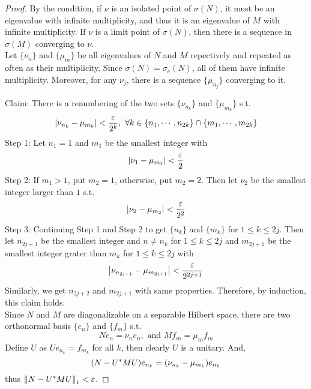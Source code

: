 \begin{proof}
	By the condition, if $\nu$ is an isolated point of $\sigma(N)$, it must be an eigenvalue with infinite multiplicity, and thus it is an eigenvalue of $M$ with infinite multiplicity. If $\nu$ is a limit point of $\sigma(N)$, then there is a sequence in $\sigma(M)$ converging to $\nu$. \\
	Let $\{\nu_n\}$ and $\{\mu_m\}$ be all eigenvalues of $N$ and $M$ repectively and repeated as often as their multiplicity. Since $\sigma(N) = \sigma_e(N)$, all of them have infinite multiplicity. Moreover, for any $\nu_j$, there is a sequence $\{\mu_{n_j}\}$ converging to it.
	\item Claim: There is a renumbering of the two sets $\{\nu_{n_k}\}$ and $\{\mu_{m_k}\}$ s.t. 
	\begin{equation*}
		\left\lvert\nu_{n_k} - \mu_{m_k}\right\lvert < \frac{\varepsilon}{2^k},~ \forall k \in \{n_1, \cdots, n_{2k}\} \cap \{m_1, \cdots, m_{2k}\}
	\end{equation*}
	Step 1: Let $n_1 = 1$ and $m_1$ be the smallest integer with 
	\begin{equation*}
		\left\lvert\nu_1 - \mu_{m_1}\right\lvert < \frac{\varepsilon}{2}
	\end{equation*}
	Step 2: If $m_1 > 1$, put $m_2 = 1$, otherwise, put $m_2 =2$. Then let $\nu_2$ be the smallest integer larger than $1$ s.t.
	\begin{equation*}
		\left\lvert\nu_2 - \mu_{m_2}\right\lvert < \frac{\varepsilon}{2^2}
	\end{equation*}
	Step 3: Continuing Step 1 and Step 2 to get $\{n_k\}$ and $\{m_k\}$ for $1 \leqslant k \leqslant 2j$. Then let $n_{2j+1}$ be the smallest integer and $n \neq n_k$ for $1 \leqslant k \leqslant 2j$ and $m_{2j+1}$ be the smallest integer grater than $m_k$ for $1 \leqslant k \leqslant 2j$ with
	\begin{equation*}
		\left\lvert\nu_{n_{2j+1}} - \mu_{m_{2j+1}}\right\lvert < \frac{\varepsilon}{2^{2j+1}}
	\end{equation*}
	Similarly, we get $n_{2j+2}$ and $m_{2j+1}$ with same properties. Therefore, by induction, this claim holds.\\
	Since $N$ and $M$ are diagonalizable on a separable Hilbert space, there are two orthonormal basis $\{e_n\}$ and $\{f_m\}$ s.t. 
	\begin{equation*}
		Ne_n = \nu_n e_n, \text{ and } Mf_m = \mu_m f_m
	\end{equation*}
	Define $U$ as $Ue_{n_k} = f_{m_k}$ for all $k$, then clearly $U$ is a unitary. And,
	\begin{equation*}
		(N-U^{*}MU)e_{n_k} = (\nu_{n_k} - \mu_{m_k}) e_{n_k}
	\end{equation*}
	thus $\left\lVert N-U^{*}MU\right\lVert_1 < \varepsilon$.
\end{proof}

